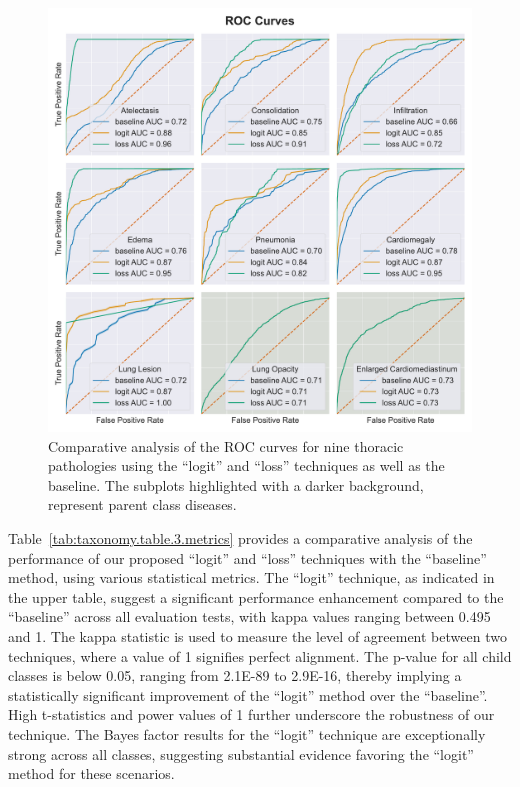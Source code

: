 \documentclass[review,1p,times,numbers]{elsarticle}
\begin{document}
\begin{figure}[htbp]
    \centering
    \includegraphics[width=\textwidth]{figures/roc_curve_all_datasets/ROC/roc_curve_all_datasets.pdf}
    \caption[Comparative Analysis of ROC Curves for Nine Thoracic Pathologies: ``logit'', ``loss'', and ``baseline'' Techniques]{Comparative analysis of the ROC curves for nine thoracic pathologies using the ``logit'' and ``loss'' techniques as well as the baseline. The subplots highlighted with a darker background, represent parent class diseases.}\label{fig:taxonomy.fig.3.roc_curve_all_datasets}
\end{figure}

Table~\ref{tab:taxonomy.table.3.metrics} provides a comparative analysis of the performance of our proposed ``logit'' and ``loss'' techniques with the ``baseline'' method, using various statistical metrics. The ``logit'' technique, as indicated in the upper table, suggest a significant performance enhancement compared to the ``baseline'' across all evaluation tests, with kappa values ranging between 0.495 and 1. The kappa statistic is used to measure the level of agreement between two techniques, where a value of 1 signifies perfect alignment. The p-value for all child classes is below 0.05, ranging from 2.1E-89 to 2.9E-16, thereby implying a statistically significant improvement of the ``logit'' method over the ``baseline''. High t-statistics and power values of 1 further underscore the robustness of our technique. The Bayes factor results for the ``logit'' technique are exceptionally strong across all classes, suggesting substantial evidence favoring the ``logit'' method for these scenarios.
\end{document}
